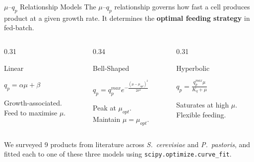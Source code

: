 \documentclass[aspectratio=169, 11pt]{beamer}
\begin{document}
\begin{frame}{$\mu$--$q_p$ Relationship Models}
  The $\mu$--$q_p$ relationship governs how fast a cell produces product at a given growth rate.
  It determines the \textbf{optimal feeding strategy} in fed-batch.

  \vspace{0.2cm}
  \begin{columns}[T]
    \begin{column}{0.31\textwidth}
      \begin{block}{Linear}
        \begin{center}
          $q_p = \alpha \mu + \beta$
        \end{center}
        \vspace{0.1cm}
        {\small Growth-associated.\\Feed to maximise $\mu$.}
      \end{block}
    \end{column}
    \begin{column}{0.34\textwidth}
      \begin{block}{Bell-Shaped}
        \begin{center}
          $q_p = q_p^{max} e^{-\frac{(\mu - \mu_{opt})^2}{2\sigma^2}}$
        \end{center}
        \vspace{0.1cm}
        {\small Peak at $\mu_{opt}$.\\Maintain $\mu = \mu_{opt}$.}
      \end{block}
    \end{column}
    \begin{column}{0.31\textwidth}
      \begin{block}{Hyperbolic}
        \begin{center}
          $q_p = \frac{q_p^{max} \mu}{K_q + \mu}$
        \end{center}
        \vspace{0.1cm}
        {\small Saturates at high $\mu$.\\Flexible feeding.}
      \end{block}
    \end{column}
  \end{columns}

  \vspace{0.3cm}
  {\small We surveyed 9 products from literature across \textit{S.\ cerevisiae} and \textit{P.\ pastoris},
  and fitted each to one of these three models using \texttt{scipy.optimize.curve\_fit}.}
\end{frame}
\end{document}
